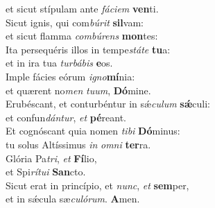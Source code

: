 \evenverse et sicut stípulam ante \textit{fá}\textit{ci}\textit{em} \textbf{ven}ti.\\
\oddverse Sicut ignis, qui com\textit{bú}\textit{rit} \textbf{sil}vam:~\*\\
\oddverse et sicut flamma \textit{com}\textit{bú}\textit{rens} \textbf{mon}tes:\\
\evenverse Ita persequéris illos in tempe\textit{stá}\textit{te} \textbf{tu}a:~\*\\
\evenverse et in ira tua \textit{tur}\textit{bá}\textit{bis} \textbf{e}os.\\
\oddverse Imple fácies eórum \textit{i}\textit{gno}\textbf{mí}nia:~\*\\
\oddverse et quærent no\textit{men} \textit{tu}\textit{um}, \textbf{Dó}mine.\\
\evenverse Erubéscant, et conturbéntur in sǽ\textit{cu}\textit{lum} \textbf{sǽ}culi:~\*\\
\evenverse et confun\textit{dán}\textit{tur}, \textit{et} \textbf{pé}reant.\\
\oddverse Et cognóscant quia nomen \textit{ti}\textit{bi} \textbf{Dó}minus:~\*\\
\oddverse tu solus Altíssimus \textit{in} \textit{om}\textit{ni} \textbf{ter}ra.\\
\evenverse Glória Pa\textit{tri}, \textit{et} \textbf{Fí}lio,~\*\\
\evenverse et Spi\textit{rí}\textit{tu}\textit{i} \textbf{San}cto.\\
\oddverse Sicut erat in princípio, et \textit{nunc}, \textit{et} \textbf{sem}per,~\*\\
\oddverse et in sǽcula sæ\textit{cu}\textit{ló}\textit{rum}. \textbf{A}men.\\
